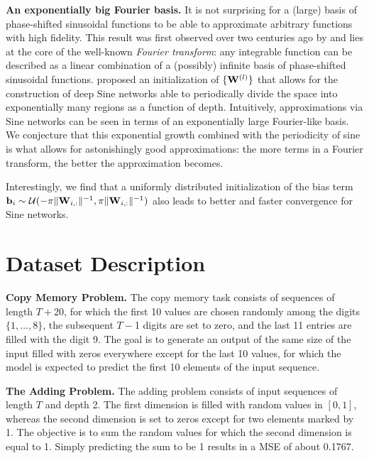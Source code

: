 \documentclass{article}
\newcommand{\mat}[1]{\ensuremath{{\mathbf{\MakeUppercase{{#1}}}}}}
\renewcommand{\vec}[1]{\ensuremath{\mathbf{\MakeLowercase{{#1}}}}}
\newcommand{\Wm}{\mat{W}}
\newcommand{\bv}{\vec{b}}
\begin{document}
\textbf{An exponentially big Fourier basis.} It is not surprising for a (large) basis of phase-shifted sinusoidal functions to be able to approximate arbitrary functions with high fidelity. This result was first observed over two centuries ago by \citet{fourier1807memoire} and lies at the core of the well-known \textit{Fourier transform}: any integrable function can be described as a linear combination of a (possibly) infinite basis of phase-shifted sinusoidal functions. \citet{sitzmann2020implicit} proposed an initialization of $\{ \Wm^{(l)} \}$ that allows for the construction of deep $\mathrm{Sine}$ networks able to periodically divide the space into exponentially many regions as a function of depth. Intuitively, approximations via $\mathrm{Sine}$ networks can be seen in terms of an exponentially large Fourier-like basis.
We conjecture that this exponential growth combined with the periodicity of sine is what allows for astonishingly good approximations: the more terms in a Fourier transform, the better the approximation becomes.

Interestingly, we find that a uniformly distributed initialization of the bias term $\bv_{i} \sim \mathcal{U}(-\pi \| \Wm_{i,:}\|^{-1},\pi \| \Wm_{i,:}\|^{-1})$ also leads to better and faster convergence for $\mathrm{Sine}$ networks.


\section{Dataset Description}\label{appx:datadescription}

\textbf{Copy Memory Problem.} The copy memory task consists of sequences of length $T +$20, for which the first 10 values are chosen randomly among the digits $\{1, . . . , 8\}$, the subsequent $T -$1 digits are set to zero, and the last 11 entries are filled with the digit 9. The goal is to generate an output of the same size of the input filled with zeros everywhere except for the last 10 values, for which the model is expected to predict the first 10 elements of the input sequence. 

\textbf{The Adding Problem.} The adding problem consists of input sequences of length $T$ and depth 2. The first dimension is filled with random values in $[0, 1]$, whereas the second dimension is set to zeros except for two elements marked by 1. The objective is to sum the random values for which the second dimension is equal to 1. Simply predicting the sum to be 1 results in a MSE of about 0.1767. 
\end{document}
